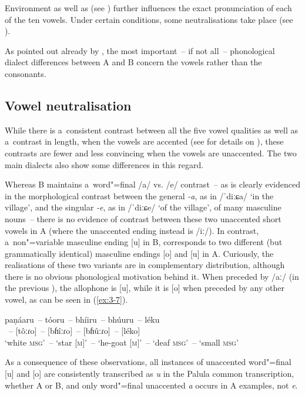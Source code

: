 Environment as well as  (see ) further influences the exact pronunciation of each of the ten vowels. Under certain conditions, some neutralisations take place (see ). 


As pointed out already by \citet[58]{morgenstierne1932}, the most important~-- if not all~-- phonological dialect differences between A and B concern the vowels rather than the consonants. 

\subsection{Vowel neutralisation}
\label{subsec:3-2-2}

While there is a~consistent contrast between all the five vowel qualities as well as a~contrast in length, when the vowels are accented (see  for details on ), these contrasts are fewer and less convincing when the vowels are unaccented. The two main dialects also show some differences in this regard. 


Whereas B maintains a~word"=final /a/ vs. /e/ contrast~-- as is clearly evidenced in the morphological contrast between the general   \textit{-a}, as in /ˈdiːɕa/ `in the village', and the  singular \textit{-e}, as in /ˈdiːɕe/ `of the village', of many masculine nouns~-- there is no evidence of contrast between these two unaccented short vowels in A (where the unaccented  ending instead is /iː/). In contrast, a~non"=variable masculine ending [u] in B, corresponds to two different (but grammatically identical) masculine endings [o] and [u] in A. Curiously, the realisations of these two variants are in complementary distribution, although there is no obvious phonological motivation behind it. When preceded by /aː/ (in the previous ), the allophone is [u], while it is [o] when preceded by any other vowel, as can be seen in (\ref{ex:3-7}).

\begin{exe}
\ex
\label{ex:3-7}
\gll paṇáaru~-- tóoru~-- bhíiru~-- bhúuru~--  léku \\
[paɳâːɾu]~-- [tôːɾo]~-- [bɦîːɾo]~-- [bɦûːɾo]~-- [léko] \\ 
\glt `white \textsc{msg}'~-- `star [\textsc{m}]'~-- `he-goat [\textsc{m}]'~-- `deaf \textsc{msg}'~-- `small \textsc{msg}'
\end{exe}

As a consequence of these observations, all instances of unaccented word"=final [u] and [o] are consistently transcribed as \textit{u} in the Palula common transcription, whether A or B, and only word"=final unaccented \textit{a} occurs in A examples, not \textit{e}.


